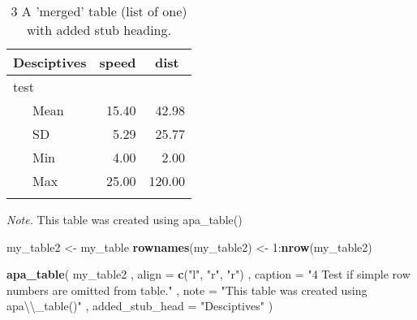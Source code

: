 \documentclass[english,man]{apa6}
\newenvironment{Shaded}{\begin{snugshade}}{\end{snugshade}}
\newcommand{\KeywordTok}[1]{\textcolor[rgb]{0.13,0.29,0.53}{\textbf{{#1}}}}
\newcommand{\DataTypeTok}[1]{\textcolor[rgb]{0.13,0.29,0.53}{{#1}}}
\newcommand{\DecValTok}[1]{\textcolor[rgb]{0.00,0.00,0.81}{{#1}}}
\newcommand{\CharTok}[1]{\textcolor[rgb]{0.31,0.60,0.02}{{#1}}}
\newcommand{\StringTok}[1]{\textcolor[rgb]{0.31,0.60,0.02}{{#1}}}
\newcommand{\NormalTok}[1]{{#1}}
\theoremstyle{definition}
\theoremstyle{definition}
\theoremstyle{definition}
\theoremstyle{remark}
\begin{document}
\begin{table}[tbp]
\begin{center}
\begin{threeparttable}
\caption{\label{tab:unnamed-chunk-4}3 A 'merged' table (list of one) with added stub heading.}
\begin{tabular}{lrr}
\toprule
Desciptives & \multicolumn{1}{c}{speed} & \multicolumn{1}{c}{dist}\\
\midrule
test &  & \\
\ \ \ Mean & 15.40 & 42.98\\
\ \ \ SD & 5.29 & 25.77\\
\ \ \ Min & 4.00 & 2.00\\
\ \ \ Max & 25.00 & 120.00\\
\bottomrule
\addlinespace
\end{tabular}
\begin{tablenotes}[para]
\textit{Note.} This table was created using apa\_table()
\end{tablenotes}
\end{threeparttable}
\end{center}
\end{table}

\begin{Shaded}
\begin{Highlighting}[]
\NormalTok{my_table2 <-}\StringTok{ }\NormalTok{my_table}
\KeywordTok{rownames}\NormalTok{(my_table2) <-}\StringTok{ }\DecValTok{1}\NormalTok{:}\KeywordTok{nrow}\NormalTok{(my_table2)}

\KeywordTok{apa_table}\NormalTok{(}
  \NormalTok{my_table2}
  \NormalTok{, }\DataTypeTok{align =} \KeywordTok{c}\NormalTok{(}\StringTok{"l"}\NormalTok{, }\StringTok{"r"}\NormalTok{, }\StringTok{"r"}\NormalTok{)}
  \NormalTok{, }\DataTypeTok{caption =} \StringTok{"4 Test if simple row numbers are omitted from table."}
  \NormalTok{, }\DataTypeTok{note =} \StringTok{"This table was created using apa}\CharTok{\textbackslash{}\textbackslash{}}\StringTok{_table()"}
  \NormalTok{, }\DataTypeTok{added_stub_head =} \StringTok{"Desciptives"}
\NormalTok{)}
\end{Highlighting}
\end{Shaded}
\end{document}
